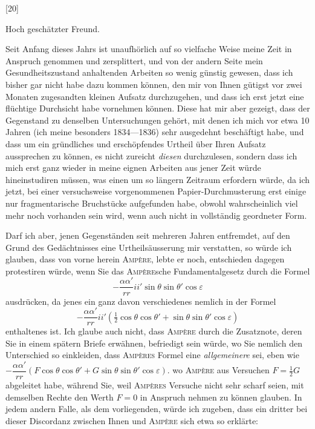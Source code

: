 \begin{center}[20]\par{}\end{center}
Hoch geschätzter Freund.

Seit Anfang dieses Jahrs ist unaufhörlich auf so vielfache Weise meine Zeit in Anspruch genommen und zersplittert, und von der andern Seite mein Gesundheitszustand anhaltenden Arbeiten so wenig günstig gewesen, dass ich bisher gar nicht habe dazu kommen können, den mir von Ihnen gütigst vor zwei Monaten zugesandten kleinen Aufsatz durchzugehen, und dass ich erst jetzt eine flüchtige Durchsicht habe vornehmen können. Diese hat mir aber gezeigt, dass der Gegenstand zu denselben Untersuchungen gehört, mit denen ich mich vor etwa 10 Jahren (ich meine besonders 1834—1836) sehr ausgedehnt beschäftigt habe, und dass um ein gründliches und erschöpfendes Urtheil über Ihren Aufsatz aussprechen zu können, es nicht zureicht \textit{diesen} durchzulesen, sondern dass ich mich erst ganz wieder in meine eignen Arbeiten aus jener Zeit würde hineinstudiren müssen, was einen um so längern Zeitraum erfordern würde, da ich jetzt, bei einer versuchsweise vorgenommenen Papier-Durchmusterung erst einige nur fragmentarische Bruchstücke aufgefunden habe, obwohl wahrscheinlich viel mehr noch vorhanden sein wird, wenn auch nicht in vollständig geordneter Form.

Darf ich aber, jenen Gegenständen seit mehreren Jahren entfremdet, auf den Grund des Gedächtnisses eine Urtheilsäusserung mir verstatten, so würde ich glauben, dass von vorne herein \textsc{Ampère}, lebte er noch, entschieden dagegen protestiren würde, wenn Sie das \textsc{Ampère}sche Fundamentalgesetz durch die Formel
\[
-\frac{\alpha\alpha'}{rr}ii'\sin\theta\sin\theta'\cos\varepsilon\tag*{(I)}
\]
ausdrücken, da jenes ein ganz davon verschiedenes nemlich in der Formel
\[
-\frac{\alpha\alpha'}{rr}ii'\left(\tfrac12\cos\theta\cos\theta'+\sin\theta\sin\theta'\cos\varepsilon\right)\tag*{(II)}
\]
enthaltenes ist. Ich glaube auch nicht, dass \textsc{Ampère} durch die Zusatznote, deren Sie in einem spätern Briefe erwähnen, befriedigt sein würde, wo Sie nemlich den Unterschied so einkleiden, dass \textsc{Ampères} Formel eine \textit{allgemeinere} sei, eben wie $-\dfrac{\alpha\alpha'}{rr}(F\cos\theta\cos\theta'+G\sin\theta\sin\theta'\cos\varepsilon)$. wo \textsc{Ampère} aus Versuchen $F=\tfrac12G$ abgeleitet habe, während Sie, weil \textsc{Ampères} Versuche nicht sehr scharf seien, mit demselben Rechte den Werth $F=0$ in Anspruch nehmen zu können glauben. In jedem andern Falle, als dem vorliegenden, würde ich zugeben, dass ein dritter bei dieser Discordanz zwischen Ihnen und \textsc{Ampère} sich etwa so erklärte:

